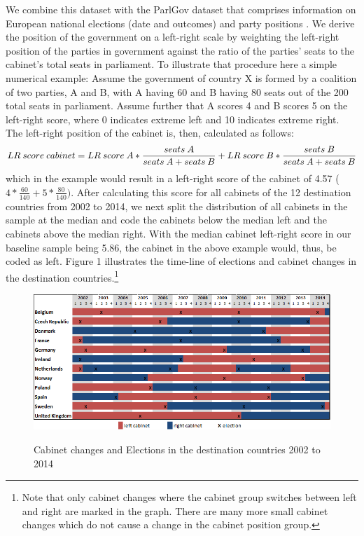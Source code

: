 \documentclass[a4paper,12pt]{article}
\begin{document}
We combine this dataset with the ParlGov dataset that comprises information on European national elections (date and outcomes) and party positions \citep{parlgov2016}. We derive the position of the government on a left-right scale by weighting the left-right position of the parties in government  against the ratio of the parties' seats to the cabinet's total seats in parliament. To illustrate that procedure here a simple numerical example: Assume the government of country X is formed by a coalition of two parties, A and B, with A having 60 and B having 80 seats out of the 200 total seats in parliament. Assume further that A scores 4 and B scores 5 on the left-right score, where 0 indicates extreme left and 10 indicates extreme right. The left-right position of the cabinet is, then, calculated as follows: 
\begin{equation*}
\tiny
LR~score~cabinet = LR~score~A * \frac{seats~A}{seats~A + seats~B} +LR~score~B * \frac{seats~B}{seats~A + seats~B} 
\end{equation*}which in the example would result in a left-right score of the cabinet of 4.57 ($4*\frac{60}{140} +5*\frac{80}{140})$.
After calculating this score for all cabinets of the 12 destination countries from 2002 to 2014, we next split the distribution of all cabinets in the sample at the median and code the cabinets below the median left and the cabinets above the median right. With the median cabinet left-right score in our baseline sample being 5.86, the cabinet in the above example would, thus, be coded as left.
Figure 1 illustrates the time-line of elections and cabinet changes in the destination countries.\footnote{Note that only cabinet changes where the cabinet group switches between left and right are marked in the graph. There are many more small cabinet changes which do not cause a change in the cabinet position group.}

\begin{figure}
	\centering
    	\caption{Cabinet changes and Elections in the destination countries 2002 to 2014}
	\includegraphics[width=1\textwidth]{elections_and_cabinet_changes.png}
	\label{Figure1}
\end{figure}
\end{document}
